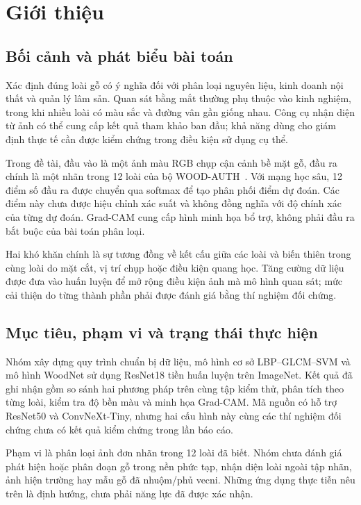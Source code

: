 \documentclass[conference]{IEEEtran}
\begin{document}
\section{Giới thiệu}
\subsection{Bối cảnh và phát biểu bài toán}
Xác định đúng loài gỗ có ý nghĩa đối với phân loại nguyên liệu, kinh doanh nội thất và quản lý lâm sản. Quan sát bằng mắt thường phụ thuộc vào kinh nghiệm, trong khi nhiều loài có màu sắc và đường vân gần giống nhau. Công cụ nhận diện từ ảnh có thể cung cấp kết quả tham khảo ban đầu; khả năng dùng cho giám định thực tế cần được kiểm chứng trong điều kiện sử dụng cụ thể.

Trong đề tài, đầu vào là một ảnh màu RGB chụp cận cảnh bề mặt gỗ, đầu ra chính là một nhãn trong 12 loài của bộ WOOD-AUTH~\cite{barmpoutis2018wood,barmpoutis2019dataset}. Với mạng học sâu, 12 điểm số đầu ra được chuyển qua softmax để tạo phân phối điểm dự đoán. Các điểm này chưa được hiệu chỉnh xác suất và không đồng nghĩa với độ chính xác của từng dự đoán. Grad-CAM cung cấp hình minh họa bổ trợ, không phải đầu ra bắt buộc của bài toán phân loại.

Hai khó khăn chính là sự tương đồng về kết cấu giữa các loài và biến thiên trong cùng loài do mặt cắt, vị trí chụp hoặc điều kiện quang học. Tăng cường dữ liệu được đưa vào huấn luyện để mở rộng điều kiện ảnh mà mô hình quan sát; mức cải thiện do từng thành phần phải được đánh giá bằng thí nghiệm đối chứng.

\subsection{Mục tiêu, phạm vi và trạng thái thực hiện}
Nhóm xây dựng quy trình chuẩn bị dữ liệu, mô hình cơ sở LBP--GLCM--SVM và mô hình WoodNet sử dụng ResNet18 tiền huấn luyện trên ImageNet. Kết quả đã ghi nhận gồm so sánh hai phương pháp trên cùng tập kiểm thử, phân tích theo từng loài, kiểm tra độ bền màu và minh họa Grad-CAM. Mã nguồn có hỗ trợ ResNet50 và ConvNeXt-Tiny, nhưng hai cấu hình này cùng các thí nghiệm đối chứng chưa có kết quả kiểm chứng trong lần báo cáo.

Phạm vi là phân loại ảnh đơn nhãn trong 12 loài đã biết. Nhóm chưa đánh giá phát hiện hoặc phân đoạn gỗ trong nền phức tạp, nhận diện loài ngoài tập nhãn, ảnh hiện trường hay mẫu gỗ đã nhuộm/phủ vecni. Những ứng dụng thực tiễn nêu trên là định hướng, chưa phải năng lực đã được xác nhận.
\end{document}
